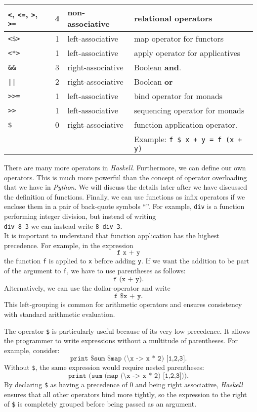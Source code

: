 \begin{center}
\begin{tabular}{|l|c|l|l|}
  \texttt{<}, \texttt{<=}, \texttt{>}, \texttt{>=} & 4 & non-associative  & relational operators \\ \hline
  \texttt{<\$>} & 1 & left-associative  & map operator for functors \\ \hline
  \texttt{<*>} & 1 & left-associative  &  apply operator for applicatives \\ \hline
  \texttt{\&\&} & 3 & right-associative  & Boolean \textbf{and}.  \\ \hline
  \texttt{||} & 2 & right-associative  & Boolean \textbf{or} \\ \hline
  \texttt{>>=} & 1 & left-associative  & bind operator for monads \\ \hline
  \texttt{>>} & 1 & left-associative  & sequencing operator for monads \\ \hline
  \texttt{\$} & 0 & right-associative & function application operator. \\
  & & & Example: \texttt{f \$ x + y = f (x + y)} \\ \hline
\end{tabular}
\end{center}

There are many more operators in \textsl{Haskell}.  Furthermore, we can define our own operators.  This is much more
powerful  than the concept of operator overloading that we have in \textsl{Python}.  We will discuss the
details later after we have discussed the definition of functions.  Finally, we can use functions as infix
operators if we enclose them in a pair of back-quote symbols ``\texttt{\textasciigrave}''.  For example,
\texttt{div} is a function performing integer division, but instead of writing
\\[0.2cm]
\hspace*{1.3cm}
\texttt{div 8 3} \quad we can instead write \quad \texttt{8 \textasciigrave div\textasciigrave\  3}.
\\[0.2cm]
It is important to understand that function application has the highest precedence. For example, in the expression
\[
\texttt{f x + y}
\]
the function \texttt{f} is applied to \texttt{x} before adding \texttt{y}. If we want the
addition to be part of the argument to \texttt{f}, we have to use parentheses as follows: 
\[
\texttt{f (x + y)}.
\]
Alternatively, we can use the dollar-operator  and write
\[
\texttt{f \$ x + y}.
\]
This left-grouping is common for arithmetic operators and ensures consistency with standard arithmetic evaluation.

The operator \texttt{\$} is particularly useful because of its very low precedence. It allows the programmer to write expressions without a multitude of parentheses. For example, consider:
\[
\texttt{print \$ sum \$ map (\textbackslash x -> x * 2) [1,2,3]}.
\]
Without \texttt{\$}, the same expression would require nested parentheses:
\[
\texttt{print (sum (map (\textbackslash x -> x * 2) [1,2,3]))}.
\]
By declaring \texttt{\$} as having a precedence of 0 and being right associative, \textsl{Haskell} ensures that all
other operators bind more tightly, so the expression to the right of \texttt{\$} is completely grouped before
being passed as an argument. 


